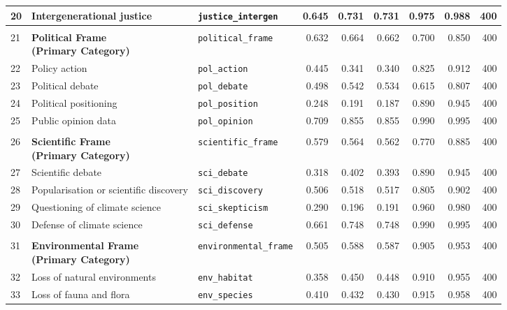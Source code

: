 \begin{longtable}{p{0.5cm}p{4.4cm}p{3.0cm}rrrrrr}
20 & Intergenerational justice & \texttt{justice\_intergen} & 0.645 & 0.731 & 0.731 & 0.975 & 0.988 & 400 \\
\midrule
\rowcolor{gray!8}
\multicolumn{9}{l}{\textit{Political Frame}} \\
\midrule
21 & \textbf{Political Frame\newline (Primary Category)} & \texttt{political\_frame} & 0.632 & 0.664 & 0.662 & 0.700 & 0.850 & 400 \\
\cmidrule(lr){1-9}
22 & Policy action & \texttt{pol\_action} & 0.445 & 0.341 & 0.340 & 0.825 & 0.912 & 400 \\
23 & Political debate & \texttt{pol\_debate} & 0.498 & 0.542 & 0.534 & 0.615 & 0.807 & 400 \\
24 & Political positioning & \texttt{pol\_position} & 0.248 & 0.191 & 0.187 & 0.890 & 0.945 & 400 \\
25 & Public opinion data & \texttt{pol\_opinion} & 0.709 & 0.855 & 0.855 & 0.990 & 0.995 & 400 \\
\midrule
\rowcolor{gray!8}
\multicolumn{9}{l}{\textit{Scientific Frame}} \\
\midrule
26 & \textbf{Scientific Frame\newline (Primary Category)} & \texttt{scientific\_frame} & 0.579 & 0.564 & 0.562 & 0.770 & 0.885 & 400 \\
\cmidrule(lr){1-9}
27 & Scientific debate & \texttt{sci\_debate} & 0.318 & 0.402 & 0.393 & 0.890 & 0.945 & 400 \\
28 & Popularisation or scientific discovery & \texttt{sci\_discovery} & 0.506 & 0.518 & 0.517 & 0.805 & 0.902 & 400 \\
29 & Questioning of climate science & \texttt{sci\_skepticism} & 0.290 & 0.196 & 0.191 & 0.960 & 0.980 & 400 \\
30 & Defense of climate science & \texttt{sci\_defense} & 0.661 & 0.748 & 0.748 & 0.990 & 0.995 & 400 \\
\midrule
\rowcolor{gray!8}
\multicolumn{9}{l}{\textit{Environmental Frame}} \\
\midrule
31 & \textbf{Environmental Frame\newline (Primary Category)} & \texttt{environmental\_frame} & 0.505 & 0.588 & 0.587 & 0.905 & 0.953 & 400 \\
\cmidrule(lr){1-9}
32 & Loss of natural environments & \texttt{env\_habitat} & 0.358 & 0.450 & 0.448 & 0.910 & 0.955 & 400 \\
33 & Loss of fauna and flora & \texttt{env\_species} & 0.410 & 0.432 & 0.430 & 0.915 & 0.958 & 400 \\

\end{longtable}

